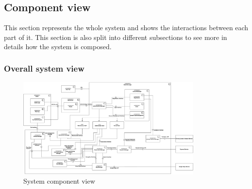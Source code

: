 \subsection{Component view}

This section represents the whole system and shows the interactions between each part of it. This section is also split into different subsections to see more in details how the system is composed.

\subsubsection{Overall system view}

\begin{figure}[h!]
	\includegraphics[width=350px]{../Datas/images/ComponentView.pdf}
	\caption{System component view}
	\label{fig:ComponentView}
\end{figure}

\newpage
